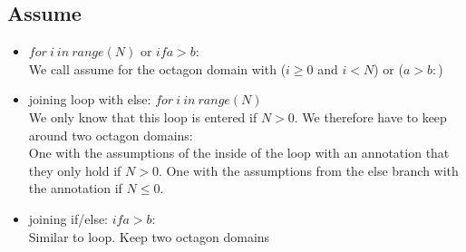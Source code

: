 \documentclass[11pt]{article}
\begin{document}
\subsection{Assume}

\begin{itemize}
  \item $for\ i\ in\ range(N)$ or $if a > b:$\\
  We call assume for the octagon domain with ($i \geq 0$ and $i < N$) or ($a > b:$)
  \item joining loop with else: $for\ i\ in\ range(N)$\\
  We only know that this loop is entered if $N > 0$. We therefore have to keep around two octagon domains:\\
  One with the assumptions of the inside of the loop with an annotation that they only hold if $N > 0$. One with the assumptions from the else branch with the annotation if $N \leq 0$.
  \item joining if/else: $if a > b:$\\
  Similar to loop. Keep two octagon domains
\end{itemize}
\end{document}
